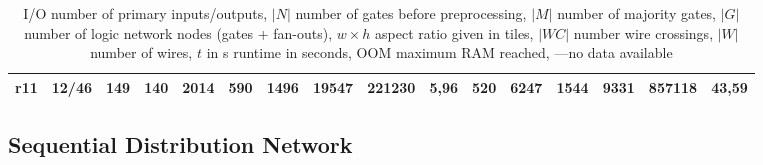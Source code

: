 \begin{sidewaystable}[htbp]
{\begin{tabular}{|l|l|r|r|r|r|r|r|r|r|r|r|r|r|r|r|}
		r11   & 12/46 & 149   & 140   & 2014  & 590   & 1496  & 19547 & 221230 & 5,96  & 520   & 6247  & 1544  & 9331  & 857118 & 43,59 \\
		\bottomrule
	\end{tabular}}%
	\caption{I/O number of primary inputs/outputs, $|N|$ number of gates before preprocessing, $|M|$ number of majority gates, $|G|$ number of logic network nodes (gates + fan-outs), $w \times h$ aspect ratio given in tiles, $|WC|$ number wire crossings, $|W|$ number of wires, $t$ in s runtime in seconds, OOM maximum RAM reached, ---no data available}\label{tab:maj_exp}%
\end{sidewaystable}%


\newpage
\subsection{Sequential Distribution Network}

